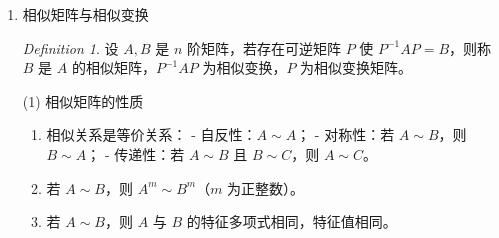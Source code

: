 \documentclass[UTF8]{ctexart}
\theoremstyle{remark}
\newtheorem{theorem}{Theorem}
\newtheorem{definition}{Definition}
\begin{document}
\begin{enumerate}
(1) 特征根和特征向量的求法  
第一步：解特征方程  
\[
|A - \lambda E| = \left|\begin{array}{cccc}
	a_{11} - \lambda & a_{12} & \cdots & a_{1n} \\
	a_{21} & a_{22} - \lambda & \cdots & a_{2n} \\
	\vdots & \vdots & & \vdots \\
	a_{n1} & a_{n2} & \cdots & a_{nn} - \lambda
\end{array}\right| = 0
\]  
求出特征值 \(\lambda_1, \lambda_2, \cdots, \lambda_s\)。  
第二步：对每个 \(\lambda_i\)，解 \((A - \lambda_i E)x = 0\)，求基础解系 \(\alpha_1, \alpha_2, \cdots, \alpha_r\)，对应 \(\lambda_i\) 的所有特征向量为 \(k_1\alpha_1 + k_2\alpha_2 + \cdots + k_r\alpha_r\)。

(2) 特征值与特征向量的性质  
\begin{theorem}
	设 \(n\) 阶方阵 \(A = (a_{ij})\) 的特征值为 \(\lambda_1, \lambda_2, \cdots, \lambda_n\)，则：  
	\begin{enumerate}
		\item \(\lambda_1 + \lambda_2 + \cdots + \lambda_n = a_{11} + a_{22} + \cdots + a_{nn}\)；  
		\item \(\lambda_1\lambda_2\cdots\lambda_n = |A|\)。
	\end{enumerate}
\end{theorem}
\begin{theorem}
	属于不同特征值的特征向量线性无关。
\end{theorem}
\begin{theorem}
	矩阵 \(A\) 和 \(A'\) 有相同的特征值。
\end{theorem}
\begin{theorem}
	若 \(\lambda\) 是 \(A\) 的特征值，则 \(\lambda^k\) 是 \(A^k\) 的特征值。
\end{theorem}
\begin{theorem}
	若 \(\lambda\) 是可逆矩阵 \(A\) 的特征值，则 \(\lambda^{-1}\) 是 \(A^{-1}\) 的特征值。
\end{theorem}

\item 相似矩阵与相似变换  
\begin{definition}
	设 \(A, B\) 是 \(n\) 阶矩阵，若存在可逆矩阵 \(P\) 使 \(P^{-1}AP = B\)，则称 \(B\) 是 \(A\) 的相似矩阵，\(P^{-1}AP\) 为相似变换，\(P\) 为相似变换矩阵。
\end{definition}

(1) 相似矩阵的性质  
\begin{enumerate}
	\item 相似关系是等价关系：  
	- 自反性：\(A \sim A\)；  
	- 对称性：若 \(A \sim B\)，则 \(B \sim A\)；  
	- 传递性：若 \(A \sim B\) 且 \(B \sim C\)，则 \(A \sim C\)。  
	\item 若 \(A \sim B\)，则 \(A^m \sim B^m\)（\(m\) 为正整数）。  
	\item 若 \(A \sim B\)，则 \(A\) 与 \(B\) 的特征多项式相同，特征值相同。  
\end{enumerate}


\end{enumerate}
\end{document}
